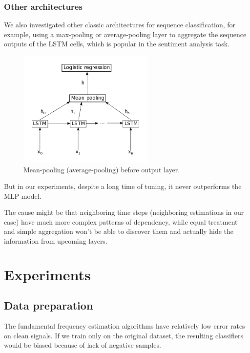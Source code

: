 \documentclass[11pt,a4paper]{report}
\begin{document}
\newpage

\subsection{Other architectures}

We also investigated other classic architectures for sequence classification, for example, using a max-pooling or average-pooling layer to aggregate the sequence outputs of the LSTM cells, which is popular in the sentiment analysis task.

\begin{figure}[htbp]
  \centering
  \includegraphics[width=0.6\textwidth]{sentiment.png}
  \caption{Mean-pooling (average-pooling) before output layer.} \label{fig:sentiment}
\end{figure}

But in our experiments, despite a long time of tuning, it never outperforms the MLP model.

The cause might be that neighboring time steps (neighboring estimations in our case) have much more complex patterns of dependency, while equal treatment and simple aggregation won't be able to discover them and actually hide the information from upcoming layers.

\chapter{Experiments}

\section{Data preparation}

The fundamental frequency estimation algorithms have relatively low error rates on clean signals.
If we train only on the original dataset, the resulting classifiers would be biased because of lack of negative samples.
\end{document}
